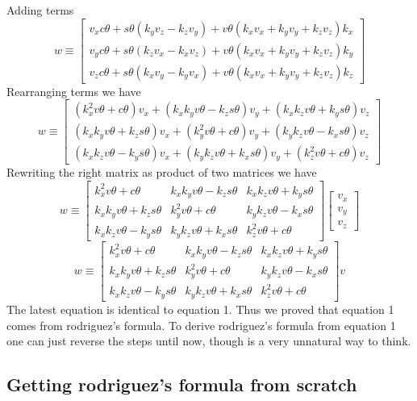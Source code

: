\documentclass[12pt]{article}
\begin{document}
Adding terms
\[
  w
  \equiv
  \begin{bmatrix}
  v_x c\theta + s\theta (k_y v_z - k_z v_y) + v\theta (k_x v_x + k_y v_y + k_z v_z) k_x \\
  v_y c\theta + s\theta (k_z v_x - k_x v_z) + v\theta (k_x v_x + k_y v_y + k_z v_z) k_y \\
  v_z c\theta + s\theta (k_x v_y - k_y v_x) + v\theta (k_x v_x + k_y v_y + k_z v_z) k_z
  \end{bmatrix}
\]
Rearranging terms we have
\[
  w
  \equiv
  \begin{bmatrix}
    (k_x^2v\theta + c\theta)v_x + (k_xk_yv\theta - k_zs\theta)v_y + (k_xk_zv\theta + k_ys\theta)v_z\\
    (k_xk_yv\theta + k_zs\theta)v_x + (k_y^2v\theta + c\theta)v_y + (k_yk_zv\theta - k_xs\theta)v_z \\
    (k_xk_zv\theta - k_ys\theta)v_x + (k_yk_zv\theta + k_xs\theta)v_y +(k_z^2v\theta + c\theta)v_z
  \end{bmatrix}
\]
Rewriting the right matrix as product of two matrices we have
\[
  w
  \equiv
  \begin{bmatrix}
    k_x^2v\theta + c\theta & k_xk_yv\theta - k_zs\theta & k_xk_zv\theta + k_ys\theta\\
    k_xk_yv\theta + k_zs\theta & k_y^2v\theta + c\theta & k_yk_zv\theta - k_xs\theta \\
    k_xk_zv\theta - k_ys\theta & k_yk_zv\theta + k_xs\theta & k_z^2v\theta + c\theta
  \end{bmatrix}
  \begin{bmatrix} v_x \\ v_y \\ v_z \end{bmatrix}
\]
\[
  w
  \equiv
  \begin{bmatrix}
    k_x^2v\theta + c\theta & k_xk_yv\theta - k_zs\theta & k_xk_zv\theta + k_ys\theta\\
    k_xk_yv\theta + k_zs\theta & k_y^2v\theta + c\theta & k_yk_zv\theta - k_xs\theta \\
    k_xk_zv\theta - k_ys\theta & k_yk_zv\theta + k_xs\theta & k_z^2v\theta + c\theta
  \end{bmatrix}
  v
\]
The latest equation is identical to equation 1.
Thus we proved that equation 1 comes from rodriguez’s formula.
To derive rodriguez’s formula from equation 1 one can just reverse the steps until now, though is a very unnatural way to think.

\subsection*{Getting rodriguez’s formula from scratch}
\end{document}
